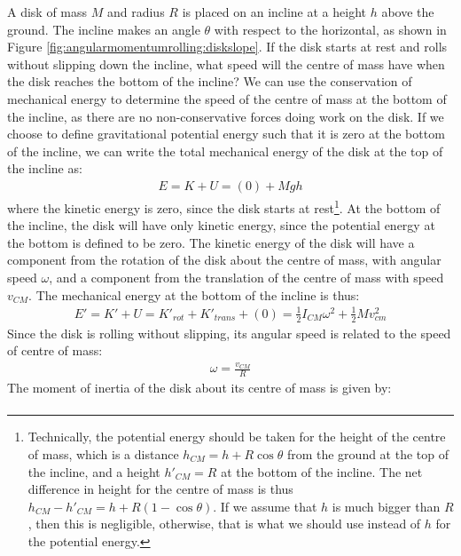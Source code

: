 \begin{example}{ A disk of mass $M$ and radius $R$ is placed on an incline at a height $h$ above the ground. The incline makes an angle $\theta$ with respect to the horizontal, as shown in Figure \ref{fig:angularmomentumrolling:diskslope}. If the disk starts at rest and rolls without slipping down the incline, what speed will the centre of mass have when the disk reaches the bottom of the incline? }
We can use the conservation of mechanical energy to determine the speed of the centre of mass at the bottom of the incline, as there are no non-conservative forces doing work on the disk. If we choose to define gravitational potential energy such that it is zero at the bottom of the incline, we can write the total mechanical energy of the disk at the top of the incline as:
\begin{align*}
E = K+U=(0)+Mgh
\end{align*}
where the kinetic energy is zero, since the disk starts at rest\footnote{Technically, the potential energy should be taken for the height of the centre of mass, which is a distance $h_{CM}=h+R\cos\theta$ from the ground at the top of the incline, and a height $h'_{CM}=R$ at the bottom of the incline. The net difference in height for the centre of mass is thus $h_{CM}-h'_{CM} = h+R(1-\cos\theta)$. If we assume that $h$ is much bigger than $R$, then this is negligible, otherwise, that is what we should use instead of $h$ for the potential energy.}. At the bottom of the incline, the disk will have only kinetic energy, since the potential energy at the bottom is defined to be zero. The kinetic energy of the disk will have a component from the rotation of the disk about the centre of mass, with angular speed $\omega$, and a component from the translation of the centre of mass with speed $v_{CM}$. The mechanical energy at the bottom of the incline is thus:
\begin{align*}
E' = K' + U = K'_{rot}+K'_{trans}+(0)=\frac{1}{2}I_{CM}\omega^2 + \frac{1}{2}Mv_{cm}^2
\end{align*}
Since the disk is rolling without slipping, its angular speed is related to the speed of centre of mass:
\begin{align*}
\omega = \frac{v_{CM}}{R}
\end{align*}
The moment of inertia of the disk about its centre of mass is given by:
\begin{align*}

\end{align*}
\end{example}
